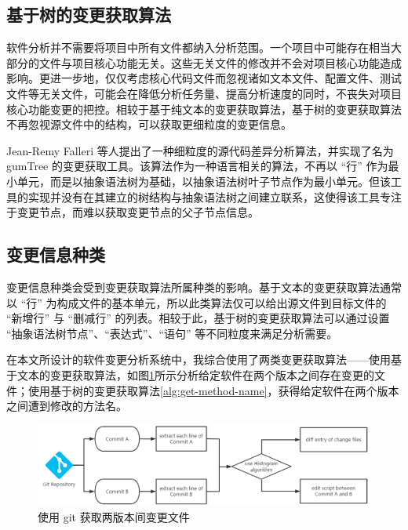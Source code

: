 \subsection{基于树的变更获取算法}

软件分析并不需要将项目中所有文件都纳入分析范围。一个项目中可能存在相当大部分的文件与项目核心功能无关。这些无关文件的修改并不会对项目核心功能造成影响。更进一步地，仅仅考虑核心代码文件而忽视诸如文本文件、配置文件、测试文件等无关文件，可能会在降低分析任务量、提高分析速度的同时，不丧失对项目核心功能变更的把控。相较于基于纯文本的变更获取算法，基于树的变更获取算法不再忽视源文件中的结构，可以获取更细粒度的变更信息。

Jean-Remy Falleri 等人提出了一种细粒度的源代码差异分析算法，并实现了名为 gumTree 的变更获取工具\cite{DBLP:conf/kbse/FalleriMBMM14}。该算法作为一种语言相关的算法，不再以 “行” 作为最小单元，而是以抽象语法树为基础，以抽象语法树叶子节点作为最小单元。但该工具的实现并没有在其建立的树结构与抽象语法树之间建立联系，这使得该工具专注于变更节点，而难以获取变更节点的父子节点信息。

\subsection{变更信息种类}

变更信息种类会受到变更获取算法所属种类的影响。基于文本的变更获取算法通常以 “行” 为构成文件的基本单元，所以此类算法仅可以给出源文件到目标文件的 “新增行” 与 “删减行” 的列表。相较于此，基于树的变更获取算法可以通过设置 “抽象语法树节点”、“表达式”、“语句” 等不同粒度来满足分析需要。

在本文所设计的软件变更分析系统中，我综合使用了两类变更获取算法——使用基于文本的变更获取算法，如图\ref{fig:git-alg}所示分析给定软件在两个版本之间存在变更的文件；使用基于树的变更获取算法\ref{alg:get-method-name}，获得给定软件在两个版本之间遭到修改的方法名。

\begin{figure}
    \centering
    \includegraphics[width=.8\textwidth]{figures/git-alg.png}
    \caption{使用 git 获取两版本间变更文件}
    \label{fig:git-alg}
\end{figure}

